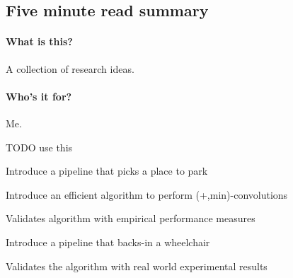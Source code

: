 \subsection{Five minute read summary}

\paragraph{What is this?} A collection of research ideas.

\paragraph{Who's it for?} Me.

TODO use this \cite{viswanathan2011navigation}



\item Introduce a pipeline that picks a place to park
\item Introduce an efficient algorithm to perform (+,min)-convolutions
\item Validates algorithm with empirical performance measures
\item Introduce a pipeline that backs-in a wheelchair
\item Validates the algorithm with real world experimental results

